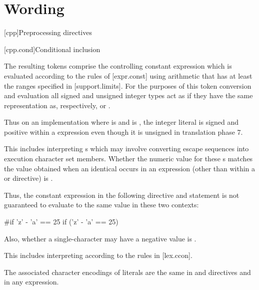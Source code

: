 \documentclass{wg21}
\begin{document}
\section{Wording}


[cpp]{Preprocessing directives}%

[cpp.cond]{Conditional inclusion}%

\pnum
The resulting tokens comprise the controlling constant expression
which is evaluated according to the rules of [expr.const]
using arithmetic that has at least the ranges specified
in [support.limits]. For the purposes of this token conversion and evaluation
all signed and unsigned integer types
act as if they have the same representation as, respectively,
 or .
\begin{note}
    Thus on an
    implementation where  is 
    and  is ,
    the integer literal  is signed and positive within a 
    expression even though it is unsigned in translation phase
    7.
\end{note}
\begin{removedblock}
This includes interpreting s which may involve
converting escape sequences into execution character set members.
Whether the numeric value for these s
matches the value obtained when an identical 
occurs in an expression
(other than within a
or
directive)
is .
\begin{note}
    Thus, the constant expression in the following
    directive and
     statement
    is not guaranteed to evaluate to the same value in these two
    contexts:
    \begin{codeblock}
        #if 'z' - 'a' == 25
        if ('z' - 'a' == 25)
    \end{codeblock}
\end{note}
Also, whether a single-character  may have a negative
value is .
\end{removedblock}
\begin{addedblock}
This includes interpreting  according to the rules in [lex.ccon].
\begin{note}
The associated character encodings of literals are the same in  and  directives and in any expression.
\end{note}
\end{addedblock}
\end{document}
